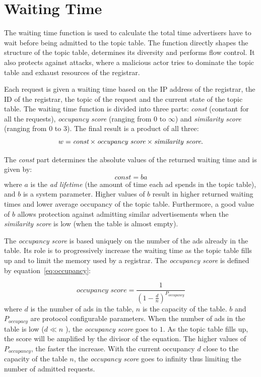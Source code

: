 \section{Waiting Time}
\label{sec:waitingTime}


The waiting time function is used to calculate the total time advertisers have to wait before being admitted to the topic table. 
The function directly shapes the structure of the topic table,  determines its diversity and performs flow control. 
It also protects against attacks, where a malicious actor tries to dominate the topic table and exhaust resources of the registrar. 

Each request is given a waiting time based on the IP address of the registrar, the ID of the registrar, the topic of the request and the current state of the topic table. 
The waiting time function is divided into three parts: \emph{const} (constant
for all the requests), \emph{occupancy score} (ranging from $0$ to $\infty$)
and  \emph{similarity score} (ranging from $0$ to $3$). The final result is a
product of all three:
\begin{equation}
\label{eq:global}
w = \emph{const} \times \textit{occupancy score} \times \textit{similarity score}. 
\end{equation}

The \emph{const} part determines the absolute values of the returned waiting time and is given by:
\begin{equation}
\label{eq:const}
    \textit{const} = ba
\end{equation}
where $a$ is the \emph{ad lifetime} (the amount of time each ad spends in the
topic table), and $b$ is a system parameter. Higher values of $b$ result in
higher returned waiting times and lower average occupancy of the topic table.
Furthermore, a good value of $b$ allows protection against admitting similar advertisements when the \emph{similarity score} is low (\ie when the table is almost empty).

The \emph{occupancy score} is based uniquely on the number of the ads already in the table.
Its role is to progressively increase the waiting time as the topic table fills up and to limit the memory used by a registrar.
The \emph{occupancy score} is defined by equation~\ref{eq:occupancy}:

\begin{equation}
\label{eq:occupancy}
    \textit{occupancy score} = \frac{1}{(1-\frac{d}{n})^{P_{occupancy}}}
\end{equation}
where $d$ is the number of ads in the table, $n$ is the capacity of the table. $b$ and $P_{occupacy}$ are protocol configurable parameters. 
When the number of ads in the table is low ($d \ll n$ ), the \emph{occupancy score} goes to $1$. 
As the topic table fills up, the score will be amplified by the divisor of the equation. 
The higher values of $P_{occupancy}$, the faster the increase. 
With the current occupancy $d$ close to the capacity of the table $n$, the \emph{occupancy score} goes to infinity thus limiting the number of admitted requests.

